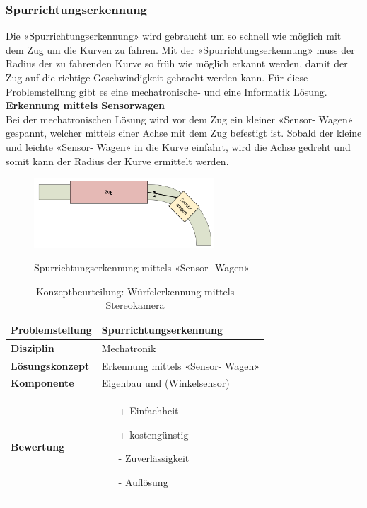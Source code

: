 \documentclass[../../../main.tex]{subfiles}
\begin{document}
    \subsubsection{Spurrichtungserkennung}
	Die «Spurrichtungserkennung» wird gebraucht um so schnell wie möglich mit dem Zug um die Kurven zu fahren. Mit der «Spurrichtungserkennung» muss der Radius der zu fahrenden Kurve so früh wie möglich erkannt werden, damit der Zug auf die richtige Geschwindigkeit gebracht werden kann. Für diese Problemstellung gibt es eine mechatronische- und eine Informatik Lösung.\\

    \textbf{Erkennung mittels Sensorwagen}\\
    Bei der mechatronischen Lösung wird vor dem Zug ein kleiner «Sensor- Wagen» gespannt, welcher mittels einer Achse
    mit dem Zug befestigt ist. Sobald der kleine und leichte «Sensor- Wagen» in die Kurve einfahrt, wird die Achse gedreht
    und somit kann der Radius der Kurve ermittelt werden.\\
    \begin{figure}[H] %
        \centering
        \includegraphics[width=0.6\textwidth]{spurrichtung_mechatronik.png}
        \label{fig:obj_spurrichtung}
        \caption{Spurrichtungserkennung mittels «Sensor- Wagen»}
    \end{figure}

    \begin{flushleft}
        \begin{table}[H]
        \begin{tabular}{ | l | p{11cm} |}
        \hline
        \textbf{Problemstellung} & Spurrichtungserkennung \\ \hline
        \textbf{Disziplin} & Mechatronik \\ \hline
        \textbf{Lösungskonzept} & Erkennung mittels «Sensor- Wagen» \\ \hline
        \textbf{Komponente} & Eigenbau und (Winkelsensor) \\ \hline
        \textbf{Bewertung} &  \begin{itemize}
                                \item[+] Einfachheit
                                \item[+] kostengünstig
                                \item[-] Zuverlässigkeit
                                \item[-] Auflösung   
                              \end{itemize} \\ \hline
        \end{tabular}
        \caption{Konzeptbeurteilung: Würfelerkennung mittels Stereokamera}
        \label{tab:konzept_wurfel_Stereokamera}
    \end{table}
    \end{flushleft}
\end{document}
